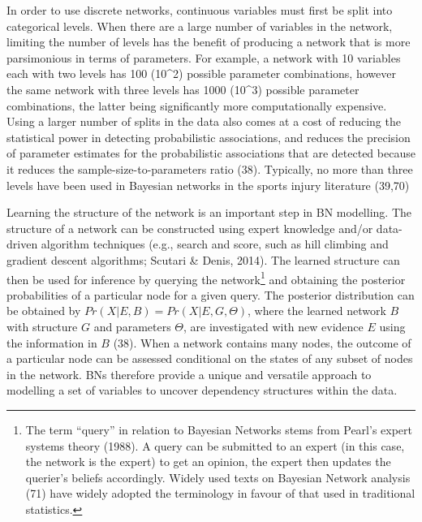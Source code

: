 \documentclass[
  english,
  man]{apa6}
\begin{document}
In order to use discrete networks, continuous variables must first be split into categorical levels.
When there are a large number of variables in the network, limiting the number of levels has the benefit of producing a network that is more parsimonious in terms of parameters. For example, a network with 10 variables each with two levels has 100 (10\^{}2) possible parameter combinations, however the same network with three levels has 1000 (10\^{}3) possible parameter combinations, the latter being significantly more computationally expensive. Using a larger number of splits in the data also comes at a cost of reducing the statistical power in detecting probabilistic associations, and reduces the precision of parameter estimates for the probabilistic associations that are detected because it reduces the sample-size-to-parameters ratio (38). Typically, no more than three levels have been used in Bayesian networks in the sports injury literature (39,70)

Learning the structure of the network is an important step in BN modelling. The structure of a network can be constructed using expert knowledge and/or data-driven algorithm techniques (e.g., search and score, such as hill climbing and gradient descent algorithms; Scutari \& Denis, 2014).
The learned structure can then be used for inference by querying the network\footnote{The term ``query'' in relation to Bayesian Networks stems from Pearl's expert systems theory (1988). A query can be submitted to an expert (in this case, the network is the expert) to get an opinion, the expert then updates the querier's beliefs accordingly. Widely used texts on Bayesian Network analysis (71) have widely adopted the terminology in favour of that used in traditional statistics.} and obtaining the posterior probabilities of a particular node for a given query.
The posterior distribution can be obtained by \(Pr(X|E,B) = Pr(X|E,G,\Theta)\), where the learned network \(B\) with structure \(G\) and parameters \(\Theta\), are investigated with new evidence \(E\) using the information in \(B\) (38).
When a network contains many nodes, the outcome of a particular node can be assessed conditional on the states of any subset of nodes in the network.
BNs therefore provide a unique and versatile approach to modelling a set of variables to uncover dependency structures within the data.
\end{document}
